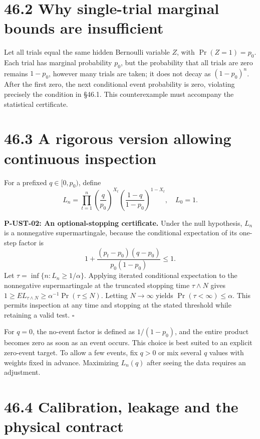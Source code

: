 \documentclass[
  11pt,
  oneside]{book}
\begin{document}
\section{46.2 Why single-trial marginal bounds are insufficient}

Let all trials equal the same hidden Bernoulli variable \(Z\), with
\(\Pr(Z=1)=p_0\). Each trial has marginal probability \(p_0\), but the
probability that all trials are zero remains \(1-p_0\), however many
trials are taken; it does not decay as \((1-p_0)^n\). After the first
zero, the next conditional event probability is zero, violating
precisely the condition in §46.1. This counterexample must accompany the
statistical certificate.

\section{46.3 A rigorous version allowing continuous inspection}

For a prefixed \(q\in[0,p_0)\), define \[
L_n=\prod_{t=1}^n
\left(\frac q{p_0}\right)^{X_t}
\left(\frac{1-q}{1-p_0}\right)^{1-X_t},\quad L_0=1.
\]

\label{p-ust-02}{}

\textbf{P-UST-02: An optional-stopping certificate.} Under the null
hypothesis, \(L_n\) is a nonnegative supermartingale, because the
conditional expectation of its one-step factor is \[
1+\frac{(p_t-p_0)(q-p_0)}{p_0(1-p_0)}\le1.
\] Let \(\tau=\inf\{n:L_n\ge1/\alpha\}\). Applying iterated conditional
expectation to the nonnegative supermartingale at the truncated stopping
time \(\tau\wedge N\) gives
\(1\ge E L_{\tau\wedge N}\ge\alpha^{-1}\Pr(\tau\le N)\). Letting
\(N\to\infty\) yields \(\Pr(\tau<\infty)\le\alpha\). This permits
inspection at any time and stopping at the stated threshold while
retaining a valid test. \(\square\)

For \(q=0\), the no-event factor is defined as \(1/(1-p_0)\), and the
entire product becomes zero as soon as an event occurs. This choice is
best suited to an explicit zero-event target. To allow a few events, fix
\(q>0\) or mix several \(q\) values with weights fixed in advance.
Maximizing \(L_n(q)\) after seeing the data requires an adjustment.

\section{46.4 Calibration, leakage and the physical contract}
\end{document}
